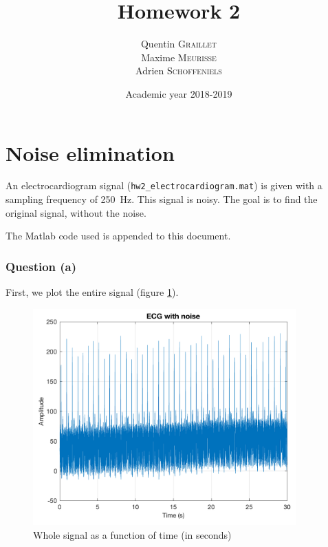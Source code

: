 \documentclass[a4paper, 12pt]{article}
\title{Homework 2}
\author{
    Quentin \textsc{Graillet}\\
    Maxime \textsc{Meurisse}\\
    Adrien \textsc{Schoffeniels}\\
}
\date{Academic year 2018-2019}
\begin{document}
	
	\section{Noise elimination}
	An electrocardiogram signal (\texttt{hw2\_electrocardiogram.mat}) is given with a sampling frequency of \SI{250}{\hertz}. This signal is noisy. The goal is to find the original signal, without the noise.\par
	The Matlab code used is appended to this document.
	\subsubsection*{Question (a)}
	First, we plot the entire signal (figure \ref{fig:plot_a}).
	\begin{figure}[H]
	    \centering
	    \includegraphics[width=0.9\textwidth]{resources/pdf/plot_a.pdf}
	    \caption{Whole signal as a function of time (in seconds)}
	    \label{fig:plot_a}
	\end{figure}
\end{document}
